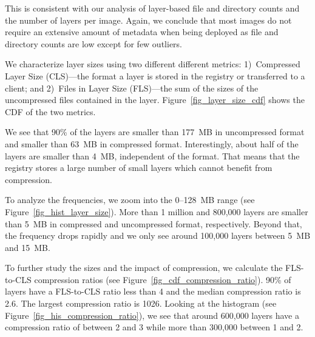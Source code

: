This is consistent with our analysis of layer-based file and directory counts
and the number of layers per image. Again, we conclude that most images do not
require an extensive amount of metadata when being deployed as file and
directory counts are low except for few outliers.

We characterize layer sizes using two different different metrics:
%
1)~Compressed Layer Size (CLS)---the format a layer is stored in the registry
or transferred to a client;
%
%
and 2)~Files in Layer Size (FLS)---the sum of the sizes of the uncompressed
files contained in the layer.
%
Figure~\ref{fig_layer_size_cdf} shows the CDF of the two metrics.


We see that 90\% of the layers are smaller than 177~MB in uncompressed format
and smaller than 63~MB in compressed format.
%
Interestingly, about half of the layers are smaller than 4~MB, independent of
the format. That means that the registry stores a large number of small layers
which cannot benefit from compression.

To analyze the frequencies, we zoom into the 0--128~MB range (see
Figure~\ref{fig_hist_layer_size}).
%
More than 1 million and 800,000 layers are smaller than 5~MB in compressed and
uncompressed format, respectively. Beyond that, the frequency drops rapidly and
we only see around 100,000 layers between 5~MB and 15~MB.

%


To further study the sizes and the impact of compression, we calculate the
FLS-to-CLS compression ratios (see Figure~\ref{fig_cdf_compression_ratio}).
%
%
90\% of layers have a  FLS-to-CLS ratio less than 4 and the median compression
ratio is 2.6. The largest compression ratio is 1026.
%
%
%
%
Looking at the histogram (see Figure~\ref{fig_his_compression_ratio}), we see
that around 600,000 layers have a compression ratio of between 2 and 3 while
more than 300,000 between 1 and 2.
%

